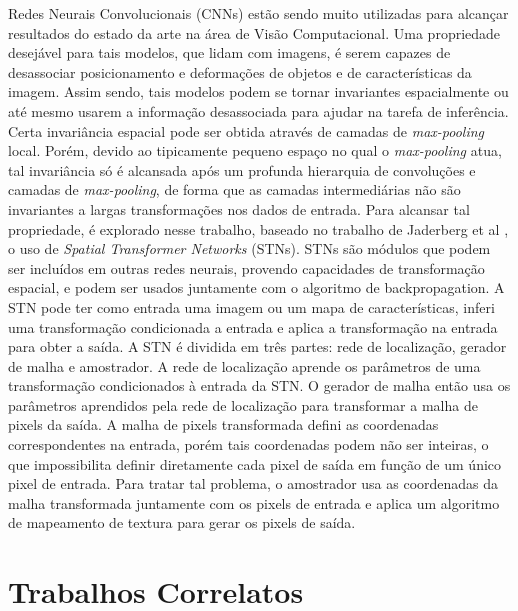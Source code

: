 \documentclass[conference]{IEEEtran}
\begin{document}
Redes Neurais Convolucionais (CNNs) estão sendo muito utilizadas para alcançar resultados do estado da arte na área de Visão Computacional. Uma propriedade desejável para tais modelos, que lidam com imagens, é serem capazes de desassociar posicionamento e deformações de objetos e de características da imagem. Assim sendo, tais modelos podem se tornar invariantes espacialmente ou até mesmo usarem a informação desassociada para ajudar na tarefa de inferência.
Certa invariância espacial pode ser obtida através de camadas de \textit{max-pooling} local. Porém, devido ao tipicamente pequeno espaço no qual o \textit{max-pooling} atua, tal invariância só é alcansada após um profunda hierarquia de convoluções e camadas de \textit{max-pooling}, de forma que as camadas intermediárias não são invariantes a largas transformações nos dados de entrada.
Para alcansar tal propriedade, é explorado nesse trabalho, baseado no trabalho de Jaderberg et al \cite{jaderberg2015spatial}, o uso de \textit{Spatial Transformer Networks} (STNs). STNs são módulos que podem ser incluídos em outras redes neurais, provendo capacidades de transformação espacial, e podem ser usados juntamente com o algoritmo de backpropagation. A STN pode ter como entrada uma imagem ou um mapa de características, inferi uma transformação condicionada a entrada e aplica a transformação na entrada para obter a saída.
A STN é dividida em três partes: rede de localização, gerador de malha e amostrador. A rede de localização aprende os parâmetros de uma transformação condicionados à entrada da STN. O gerador de malha então usa os parâmetros aprendidos pela rede de localização para transformar a malha de pixels da saída. A malha de pixels transformada defini as coordenadas correspondentes na entrada, porém tais coordenadas podem não ser inteiras, o que impossibilita definir diretamente cada pixel de saída em função de um único pixel de entrada. Para tratar tal problema, o amostrador usa as coordenadas da malha transformada juntamente com os pixels de entrada e aplica um algoritmo de mapeamento de textura para gerar os pixels de saída.

\section{Trabalhos Correlatos}
\end{document}
